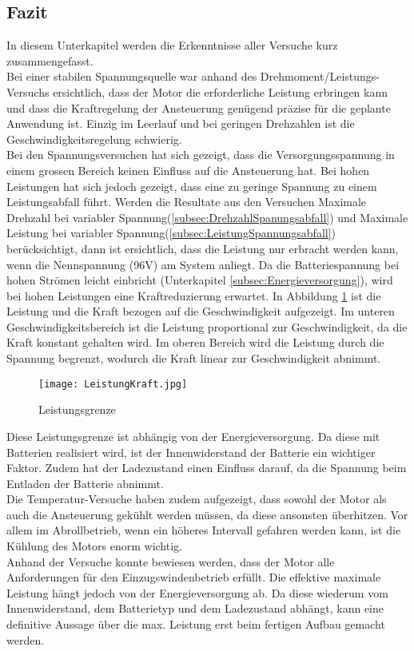 \subsection{Fazit}\label{subsec:Fazit}
In diesem Unterkapitel werden die Erkenntnisse aller Versuche kurz zusammengefasst.\\
Bei einer stabilen Spannungsquelle war anhand des Drehmoment/Leistungs-Versuchs ersichtlich, dass der Motor die erforderliche Leistung erbringen kann und dass die Kraftregelung der Ansteuerung genügend präzise für die geplante Anwendung ist. Einzig im Leerlauf und bei geringen Drehzahlen ist die Geschwindigkeitsregelung schwierig.\\
Bei den Spannungsversuchen hat sich gezeigt, dass die Versorgungsspannung in einem grossen Bereich keinen Einfluss auf die Ansteuerung hat. Bei hohen Leistungen hat sich jedoch gezeigt, dass eine zu geringe Spannung zu einem Leistungsabfall führt. Werden die Resultate aus den Versuchen \glqq Maximale Drehzahl bei variabler Spannung\grqq (\ref{subsec:DrehzahlSpanungsabfall}) und \glqq Maximale Leistung bei variabler Spannung\grqq (\ref{subsec:LeistungSpannungsabfall}) berücksichtigt, dann ist ersichtlich, dass die Leistung nur erbracht werden kann, wenn die Nennspannung (96V) am System anliegt. Da die Batteriespannung bei hohen Strömen leicht einbricht (Unterkapitel \ref{subsec:Energieversorgung}), wird bei hohen Leistungen eine Kraftreduzierung erwartet. In Abbildung \ref{fig:LeistungKraft} ist die Leistung und die Kraft bezogen auf die Geschwindigkeit aufgezeigt. Im unteren Geschwindigkeitsbereich ist die Leistung proportional zur Geschwindigkeit, da die Kraft konstant gehalten wird. Im oberen Bereich wird die Leistung durch die Spannung begrenzt, wodurch die Kraft linear zur Geschwindigkeit abnimmt.

\begin{figure}[H]
	\centering
	\texttt{[image: LeistungKraft.jpg]}
	\caption{Leistungsgrenze}\label{fig:LeistungKraft}
\end{figure}

Diese Leistungsgrenze ist abhängig von der Energieversorgung. Da diese mit Batterien realisiert wird, ist der Innenwiderstand der Batterie ein wichtiger Faktor. Zudem hat der Ladezustand einen Einfluss darauf, da die Spannung beim Entladen der Batterie abnimmt.\\
Die Temperatur-Versuche haben zudem aufgezeigt, dass sowohl der Motor als auch die Ansteuerung gekühlt werden müssen, da diese ansonsten überhitzen. Vor allem im Abrollbetrieb, wenn ein höheres Intervall gefahren werden kann, ist die Kühlung des Motors enorm wichtig.\\

Anhand der Versuche konnte bewiesen werden, dass der Motor alle Anforderungen für den Einzugswindenbetrieb erfüllt. Die effektive maximale Leistung hängt jedoch von der Energieversorgung ab. Da diese wiederum vom Innenwiderstand, dem Batterietyp und dem Ladezustand abhängt, kann eine definitive Aussage über die max. Leistung erst beim fertigen Aufbau gemacht werden.
